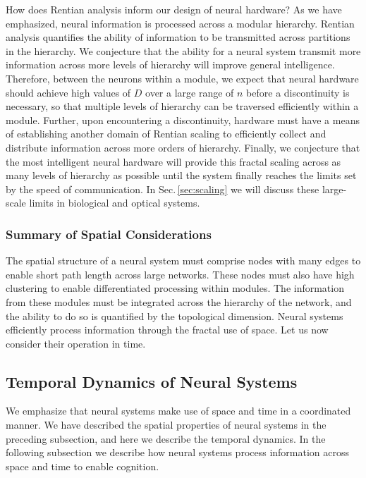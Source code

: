 \documentclass[twocolumn]{article}
\begin{document}
How does Rentian analysis inform our design of neural hardware? As we have emphasized, neural information is processed across a modular hierarchy. Rentian analysis quantifies the ability of information to be transmitted across partitions in the hierarchy. We conjecture that the ability for a neural system transmit more information across more levels of hierarchy will improve general intelligence. Therefore, between the neurons within a module, we expect that neural hardware should achieve high values of $D$ over a large range of $n$ before a discontinuity is necessary, so that multiple levels of hierarchy can be traversed efficiently within a module. Further, upon encountering a discontinuity, hardware must have a means of establishing another domain of Rentian scaling to efficiently collect and distribute information across more orders of hierarchy. Finally, we conjecture that the most intelligent neural hardware will provide this fractal scaling across as many levels of hierarchy as possible until the system finally reaches the limits set by the speed of communication. In Sec.\,\ref{sec:scaling} we will discuss these large-scale limits in biological and optical systems.

\subsubsection{Summary of Spatial Considerations}
The spatial structure of a neural system must comprise nodes with many edges to enable short path length across large networks. These nodes must also have high clustering to enable differentiated processing within modules. The information from these modules must be integrated across the hierarchy of the network, and the ability to do so is quantified by the topological dimension. Neural systems efficiently process information through the fractal use of space. Let us now consider their operation in time.

\subsection{Temporal Dynamics of Neural Systems}
We emphasize that neural systems make use of space and time in a coordinated manner. We have described the spatial properties of neural systems in the preceding subsection, and here we describe the temporal dynamics. In the following subsection we describe how neural systems process information across space and time to enable cognition. 
\end{document}

